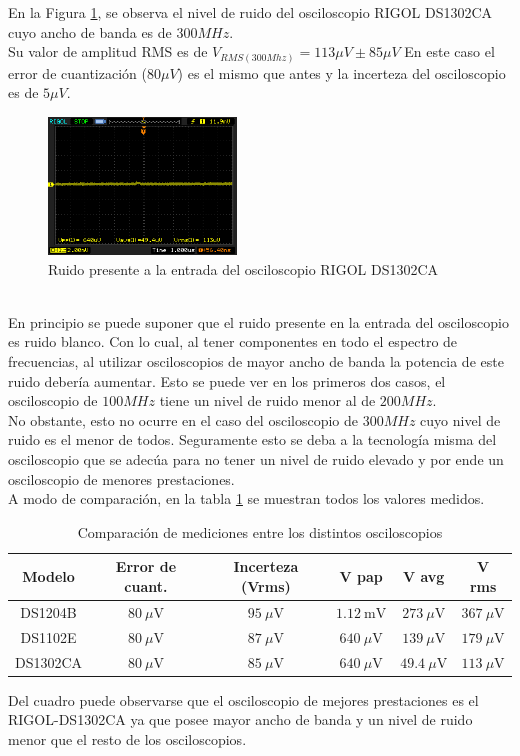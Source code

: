 \documentclass[a4paper,10pt]{article}
\begin{document}
	\indent En la Figura \ref{img007}, se observa el nivel de ruido del 
	osciloscopio RIGOL DS1302CA cuyo ancho de banda es de $300MHz$. \\
	\indent Su valor de amplitud RMS es de $V_{RMS(300Mhz)}=113\mu V \pm85\mu V$
	En este caso el error de cuantizaci\'on ($80\mu V$) es el mismo que antes y 
	la incerteza del osciloscopio es de $5\mu V$.
		\begin{figure}[!htb]
			\centering
			\includegraphics[width=5cm]
			{Imagenes/Ruido300Mhz.png}
			\caption{Ruido presente a la entrada del osciloscopio RIGOL DS1302CA
			}
			\label{img007}
		\end{figure}\\
	\indent En principio se puede suponer que el ruido presente en la entrada 
	del osciloscopio es ruido blanco. Con lo cual, al tener componentes en todo 
	el espectro de frecuencias, al utilizar osciloscopios de mayor ancho de 
	banda la potencia de este ruido deber\'ia aumentar. Esto se puede ver en los
	primeros dos casos, el osciloscopio de $100MHz$ tiene un nivel de ruido 
	menor al de $200MHz$. \\
	\indent No obstante, esto no ocurre en el caso del osciloscopio de $300MHz$ 
	cuyo nivel de ruido es el menor de todos. Seguramente esto se deba a la 
	tecnolog\'ia misma del osciloscopio que se adec\'ua para no tener un nivel 
	de ruido elevado y por ende un osciloscopio de menores prestaciones. \\
	\indent A modo de comparación, en la tabla \ref{tab001} se muestran todos 
	los valores medidos.
	
	\begin{table}[!htp]
		\centering
		\begin{tabular}{|c|c|c|c|c|c|}
			\hline
    		Modelo & Error de cuant.& Incerteza (Vrms) & V pap & V avg & V rms\\
			\hline
			DS1204B & $80~\mu\text{V}$& $95~\mu\text{V}$ & $1.12~\text{mV}$ & 
			$273~\mu\text{V}$ & $367~\mu\text{V}$ \\
			\hline 
			DS1102E & $80~\mu\text{V}$& $87~\mu\text{V}$ & $640~\mu\text{V}$ & 
			$139~\mu\text{V}$ & $179~\mu\text{V}$ \\
			\hline
			DS1302CA & $80~\mu\text{V}$& $85~\mu\text{V}$ & $640~\mu\text{V}$ & 
			$49.4~\mu\text{V}$ & $113~\mu\text{V}$ \\
			\hline
		\end{tabular}
		\caption{Comparación de mediciones entre los distintos osciloscopios} 
		\label{tab001}
	\end{table}
	Del cuadro puede observarse que el osciloscopio de mejores prestaciones es 
	el RIGOL-DS1302CA ya que posee mayor ancho de banda y un nivel de ruido 
	menor que el resto de los osciloscopios.
			
\end{document}
